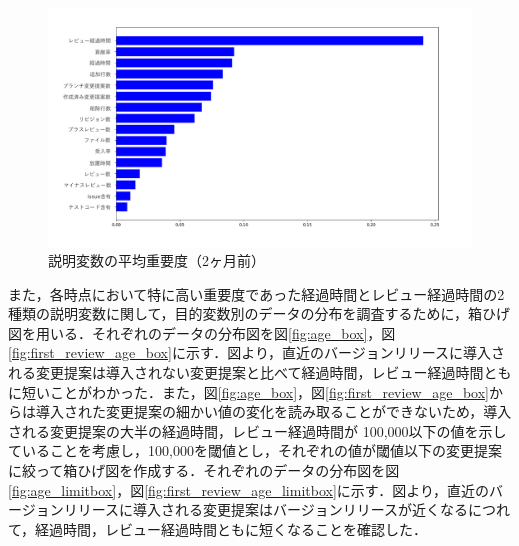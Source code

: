 \documentclass[submit,ses,noauthor]{ipsj}
\begin{document}
\begin{figure}[t]
  \centering
  \includegraphics[width=1.0\linewidth]{fig/two_months_bar.pdf}
  \caption{説明変数の平均重要度（2ヶ月前）}
  \label{fig:two_months_bar}
\end{figure}

また，各時点において特に高い重要度であった経過時間とレビュー経過時間の2種類の説明変数に関して，目的変数別のデータの分布を調査するために，箱ひげ図を用いる．それぞれのデータの分布図を図\ref{fig:age_box}，図\ref{fig:first_review_age_box}に示す．図より，直近のバージョンリリースに導入される変更提案は導入されない変更提案と比べて経過時間，レビュー経過時間ともに短いことがわかった．また，図\ref{fig:age_box}，図\ref{fig:first_review_age_box}からは導入された変更提案の細かい値の変化を読み取ることができないため，導入される変更提案の大半の経過時間，レビュー経過時間が 100,000以下の値を示していることを考慮し，100,000を閾値とし，それぞれの値が閾値以下の変更提案に絞って箱ひげ図を作成する．それぞれのデータの分布図を図\ref{fig:age_limitbox}，図\ref{fig:first_review_age_limitbox}に示す．図より，直近のバージョンリリースに導入される変更提案はバージョンリリースが近くなるにつれて，経過時間，レビュー経過時間ともに短くなることを確認した．
\end{document}
